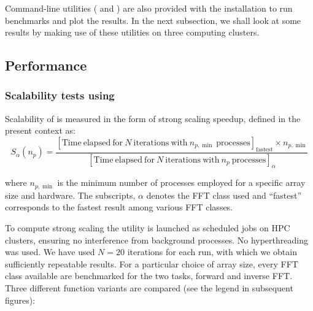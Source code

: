 Command-line utilities ( and
) are also provided with the 
installation to run benchmarks and plot the results. In the next subsection, we
shall look at some results by making use of these utilities on three computing
clusters.

\subsection{Performance}

\subsubsection{Scalability tests using }


Scalability of  is measured in the form of strong scaling speedup,
defined in the present context as:
\begin{equation*}
S_\alpha(n_p) = \frac
{[\mathrm{Time\ elapsed\ for\ } N \mathrm{\ iterations\ with\ }n_{p,\min}\mathrm{\ processes}]_{\mathrm{fastest}}
\times n_{p,\min}}
{[\mathrm{Time\ elapsed\ for\ } N \mathrm{\ iterations\ with\ } n_p \mathrm{\
processes}]_\alpha}
\label{eq:speedup}
\end{equation*}

where $n_{p,\min}$ is the minimum number of processes employed for a specific
array size and hardware. The subscripts, $\alpha$ denotes the FFT class used and
``fastest'' corresponds to the fastest result among various FFT classes.

To compute strong scaling the utility  is launched
as scheduled jobs on HPC clusters, ensuring no interference from background
processes. No hyperthreading was used.
%
We have used $N=20$ iterations for each run, with which we obtain sufficiently
repeatable results.
%
For a particular choice of array size, every FFT class available are
benchmarked for the two tasks, forward and inverse FFT. Three different function
variants are compared (see the legend in subsequent figures):

